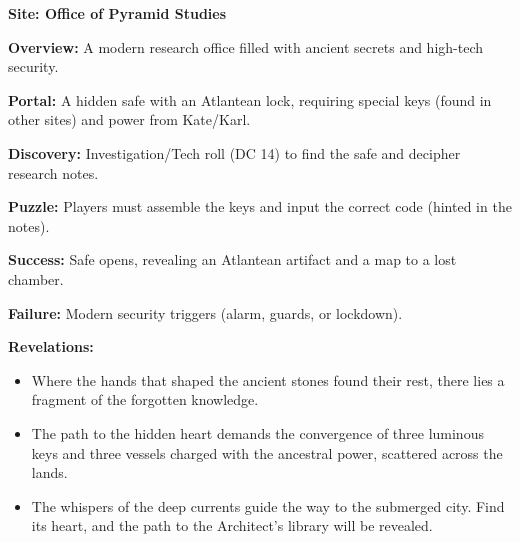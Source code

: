 \documentclass[12pt]{article}
\begin{document}
\textbf{Site: Office of Pyramid Studies}

\textbf{Overview:}  
A modern research office filled with ancient secrets and high-tech security.

\textbf{Portal:}  
A hidden safe with an Atlantean lock, requiring special keys (found in other sites) and power from Kate/Karl.

\textbf{Discovery:}  
Investigation/Tech roll (DC 14) to find the safe and decipher research notes.

\textbf{Puzzle:}  
Players must assemble the keys and input the correct code (hinted in the notes).

\textbf{Success:}  
Safe opens, revealing an Atlantean artifact and a map to a lost chamber.

\textbf{Failure:}  
Modern security triggers (alarm, guards, or lockdown).

\textbf{Revelations:}
\begin{itemize}
  \item Where the hands that shaped the ancient stones found their rest, there lies a fragment of the forgotten knowledge.
  \item The path to the hidden heart demands the convergence of three luminous keys and three vessels charged with the ancestral power, scattered across the lands.
  \item The whispers of the deep currents guide the way to the submerged city. Find its heart, and the path to the Architect's library will be revealed.
\end{itemize}
\end{document}
